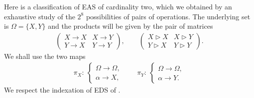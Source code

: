 \documentclass[pdftex]{sigma}
\numberwithin{equation}{section}
\begin{document}
Here is a classification of EAS of cardinality two, which we obtained by an exhaustive study of the $2^8$ possibilities of pairs of operations. The underlying set is $\Omega=\{X,Y\}$ and the products will be given by the pair of matrices
\begin{align*}
\begin{pmatrix}
X\rightarrow X&X\rightarrow Y\\Y\rightarrow X&Y\rightarrow Y
\end{pmatrix},\qquad
\begin{pmatrix}
X\triangleright X&X\triangleright Y\\Y\triangleright X&Y\triangleright Y
\end{pmatrix}.
\end{align*}
We shall use the two maps
\begin{align*}
\pi_X\colon \ \begin{cases}
\Omega\longrightarrow\Omega,\\
\alpha\longrightarrow X,
\end{cases}\qquad
\pi_Y\colon \ \begin{cases}
\Omega\longrightarrow\Omega,\\
\alpha\longrightarrow Y.
\end{cases}
\end{align*}
We respect the indexation of EDS of \cite{Foissy49}.
\end{document}
